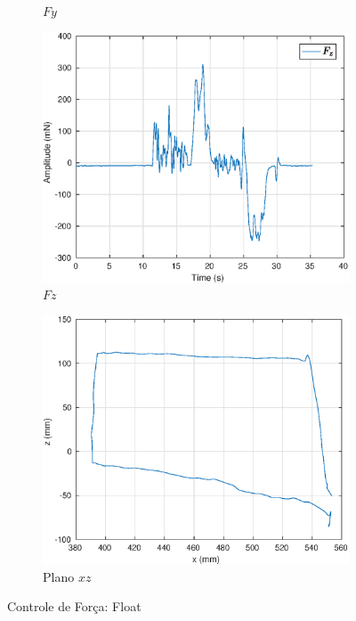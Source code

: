 \begin{figure}[H]
\begin{subfigure}{.5\textwidth}
  \caption{$Fy$}
  \label{fig:sub2}	
\end{subfigure}
\begin{subfigure}{.5\textwidth}
  \centering
  \includegraphics[width=\linewidth]{./img/float/Fz.eps}
  \caption{$Fz$}
  \label{fig:sub1}
\end{subfigure}%
\begin{subfigure}{.5\textwidth}
  \centering
  \includegraphics[width=\linewidth]{./img/float/xz.eps}
  \caption{Plano $xz$}
  \label{fig:sub2}
\end{subfigure}
\caption{Controle de Força: Float}
\label{fig:test}
\end{figure}

